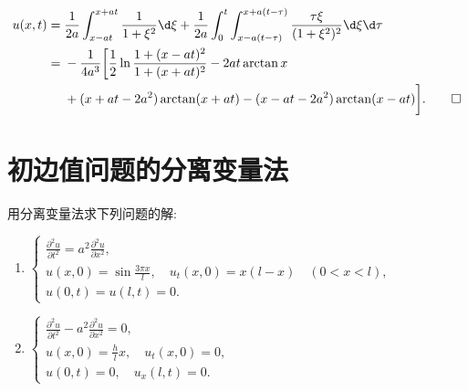 \begin{solve}
  \begin{align*}
    u(x,t)
    ={} & \frac{1}{2a}\int_{x-at}^{x+at}\frac{1}{1+\xi^2}\d\xi
      + \frac{1}{2a}\int_0^t\int_{x-a(t-\tau)}^{x+a(t-\tau)}
      \frac{\tau\xi}{(1+\xi^2)^2}\d\xi\d\tau \\
    ={} & -\frac{1}{4a^3}\bigg[\frac{1}{2}\ln\frac{1+(x-at)^2}{1+(x+at)^2}
          - 2at\arctan x \\
        & + (x+at-2a^2)\arctan (x+at) - (x-at-2a^2)\arctan (x-at)\bigg].\qedhere
  \end{align*}
\end{solve}


\section{初边值问题的分离变量法}

\begin{exercise}
  用分离变量法求下列问题的解:
  \begin{enumerate}[(1)]
    \item $\begin{cases}
      \frac{\partial^2u}{\partial t^2} = a^2 \frac{\partial^2u}{\partial x^2}, \\
      u(x,0) = \sin\frac{3\pi x}{l},\quad u_t(x,0) = x(l-x)\quad (0<x<l), \\
      u(0,t) = u(l,t) = 0.
    \end{cases}$
    \item $\begin{cases}
      \frac{\partial^2u}{\partial t^2} - a^2 \frac{\partial^2u}{\partial x^2} = 0, \\
      u(x,0) = \frac{h}{l}x, \quad u_t(x,0) = 0, \\
      u(0,t) = 0,\quad u_x(l,t) = 0.  
    \end{cases}$
  \end{enumerate}
\end{exercise}

